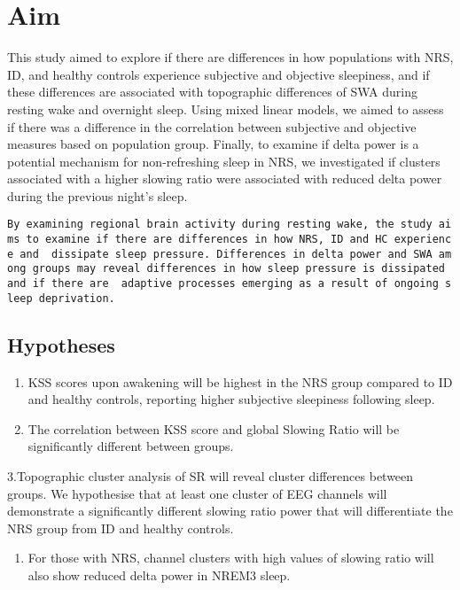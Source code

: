 \documentclass[
]{article}
\providecommand{\tightlist}{%
  \setlength{\itemsep}{0pt}\setlength{\parskip}{0pt}}
\begin{document}
\section{Aim}\label{aim}

This study aimed to explore if there are differences in how populations
with NRS, ID, and healthy controls experience subjective and objective
sleepiness, and if these differences are associated with topographic
differences of SWA during resting wake and overnight sleep. Using mixed
linear models, we aimed to assess if there was a difference in the
correlation between subjective and objective measures based on
population group. Finally, to examine if delta power is a potential
mechanism for non-refreshing sleep in NRS, we investigated if clusters
associated with a higher slowing ratio were associated with reduced
delta power during the previous night's sleep.

\texttt{By\ examining\ regional\ brain\ activity\ during\ resting\ wake,\ the\ study\ aims\ to\ examine\ if\ there\ are\ differences\ in\ how\ NRS,\ ID\ and\ HC\ experience\ and\ \ dissipate\ sleep\ pressure.\ Differences\ in\ delta\ power\ and\ SWA\ among\ groups\ may\ reveal\ differences\ in\ how\ sleep\ pressure\ is\ dissipated\ and\ if\ there\ are\ \ adaptive\ processes\ emerging\ as\ a\ result\ of\ ongoing\ sleep\ deprivation.}

\subsection{Hypotheses}\label{hypotheses}

\begin{enumerate}
\def\labelenumi{\arabic{enumi}.}
\item
  KSS scores upon awakening will be highest in the NRS group compared to
  ID and healthy controls, reporting higher subjective sleepiness
  following sleep.
\item
  The correlation between KSS score and global Slowing Ratio will be
  significantly different between groups.
\end{enumerate}

3.Topographic cluster analysis of SR will reveal cluster differences
between groups. We hypothesise that at least one cluster of EEG channels
will demonstrate a significantly different slowing ratio power that will
differentiate the NRS group from ID and healthy controls.

\begin{enumerate}
\def\labelenumi{\arabic{enumi}.}
\setcounter{enumi}{3}
\tightlist
\item
  For those with NRS, channel clusters with high values of slowing ratio
  will also show reduced delta power in NREM3 sleep.
\end{enumerate}
\end{document}
